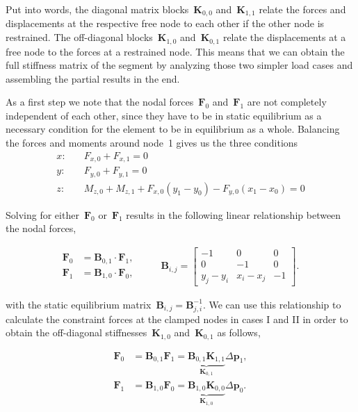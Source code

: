 Put into words, the diagonal matrix blocks~$\boldsymbol{K}_{0,0}$ and~$\boldsymbol{K}_{1,1}$ relate the forces and displacements at the respective free node to each other if the other node is restrained.
The off-diagonal blocks~$\boldsymbol{K}_{1,0}$ and~$\boldsymbol{K}_{0,1}$ relate the displacements at a free node to the forces at a restrained node.
This means that we can obtain the full stiffness matrix of the segment by analyzing those two simpler load cases and assembling the partial results in the end.

As a first step we note that the nodal forces~$\boldsymbol{F}_0$ and~$\boldsymbol{F}_1$ are not completely independent of each other, since they have to be in static equilibrium as a necessary condition for the element to be in equilibrium as a whole.
Balancing the forces and moments around node~1 gives us the three conditions
%
\begin{align}
x:\quad &F_{x,0} + F_{x,1} = 0 \\
y:\quad &F_{y,0} + F_{y,1} = 0 \\
z:\quad &M_{z,0} + M_{z,1} + F_{x,0}(y_1 - y_0) - F_{y,0}(x_1 - x_0) = 0
\end{align}

Solving for either~$\boldsymbol{F}_0$ or~$\boldsymbol{F}_1$ results in the following linear relationship between the nodal forces,

\begin{equation}
  \begin{split}
    \boldsymbol{F}_0 &= \boldsymbol{B}_{0,1}\cdot\boldsymbol{F}_1, \\
    \boldsymbol{F}_1 &= \boldsymbol{B}_{1,0}\cdot\boldsymbol{F}_0,
  \end{split}
\qquad
  \begin{split}
\boldsymbol{B}_{i,j} = \begin{bmatrix}
-1 & 0 & 0 \\
0 & -1 & 0 \\
y_j - y_i & x_i - x_j & -1
\end{bmatrix}.
  \end{split}
\end{equation}

with the static equilibrium matrix~$\boldsymbol{B}_{i,j} = \boldsymbol{B}_{j,i}^{-1}$.
We can use this relationship to calculate the constraint forces at the clamped nodes in cases I and II in order to obtain the off-diagonal stiffnesses~$\boldsymbol{K}_{1,0}$ and~$\boldsymbol{K}_{0,1}$ as follows,

\begin{align}
\boldsymbol{F}_0 &= \boldsymbol{B}_{0,1}\boldsymbol{F}_1 = \underbrace{\boldsymbol{B}_{0,1}\boldsymbol{K}_{1,1}}_{\boldsymbol{K}_{0,1}}\Delta\boldsymbol{p}_1, \\
\boldsymbol{F}_1 &= \boldsymbol{B}_{1,0}\boldsymbol{F}_0 = \underbrace{\boldsymbol{B}_{1,0}\boldsymbol{K}_{0,0}}_{\boldsymbol{K}_{1,0}}\Delta\boldsymbol{p}_0.
\end{align}

